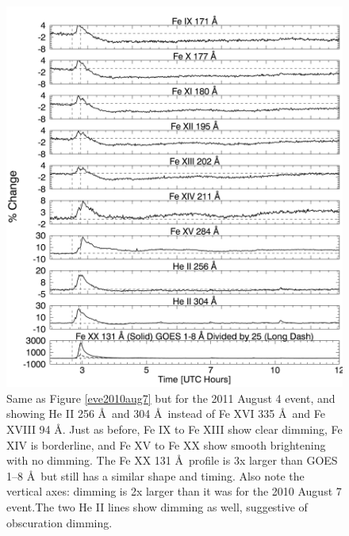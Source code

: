 \newpage
\begin{singlespace}
\begin{figure}[H]
    \begin{center}
	    \includegraphics[width=166mm]{Images/Eve2011Aug4.png}
    \end{center}
    \caption[EVE selected extracted emission lines for 2011 August 4 event]{
        Same as Figure \ref{eve2010aug7} but for the 2011 August 4 event, and showing He II 256 \AA\ and 304 \AA\ instead 
        of Fe XVI 335 \AA\ and Fe XVIII 94 \AA. Just as before, Fe IX to Fe XIII show clear 
        dimming, Fe XIV is borderline, and Fe XV to Fe XX show smooth brightening with no dimming. The Fe XX 131 \AA\ 
        profile is 3x larger than GOES 1–8 \AA\ but still has a similar shape and timing. Also note the 
        vertical axes: dimming is 2x larger than it was for the 2010 August 7 event.The two He II lines show dimming as 
        well, suggestive of obscuration dimming. 
	}
    \label{eve2011aug4}
\end{figure}
\end{singlespace}

